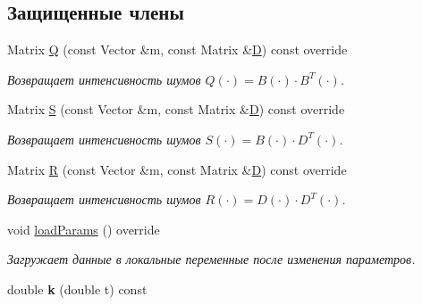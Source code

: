 \subsection*{Защищенные члены}
\begin{DoxyCompactItemize}
\item 
\hypertarget{class_tasks_1_1_continuous_1_1_landing_linear_a95641c126ba2e99da83cd6f3683b6238}{}\label{class_tasks_1_1_continuous_1_1_landing_linear_a95641c126ba2e99da83cd6f3683b6238} 
Matrix \hyperlink{class_tasks_1_1_continuous_1_1_landing_linear_a95641c126ba2e99da83cd6f3683b6238}{Q} (const Vector \&m, const Matrix \&\hyperlink{class_tasks_1_1_continuous_1_1_landing_linear_a829c4b67c6a4cd8bb1a430e4e55d9d45}{D}) const override
\begin{DoxyCompactList}\small\item\em Возвращает интенсивность шумов $Q(\cdot) = B(\cdot) \cdot B^T(\cdot)$. \end{DoxyCompactList}\item 
Matrix \hyperlink{class_tasks_1_1_continuous_1_1_landing_linear_a886bc6dd08e4355ab0c491d48f9de002}{S} (const Vector \&m, const Matrix \&\hyperlink{class_tasks_1_1_continuous_1_1_landing_linear_a829c4b67c6a4cd8bb1a430e4e55d9d45}{D}) const override
\begin{DoxyCompactList}\small\item\em Возвращает интенсивность шумов $S(\cdot) = B(\cdot) \cdot D^T(\cdot)$. \end{DoxyCompactList}\item 
\hypertarget{class_tasks_1_1_continuous_1_1_landing_linear_a1eaa8243f547b6cbd3b29ec625f887a8}{}\label{class_tasks_1_1_continuous_1_1_landing_linear_a1eaa8243f547b6cbd3b29ec625f887a8} 
Matrix \hyperlink{class_tasks_1_1_continuous_1_1_landing_linear_a1eaa8243f547b6cbd3b29ec625f887a8}{R} (const Vector \&m, const Matrix \&\hyperlink{class_tasks_1_1_continuous_1_1_landing_linear_a829c4b67c6a4cd8bb1a430e4e55d9d45}{D}) const override
\begin{DoxyCompactList}\small\item\em Возвращает интенсивность шумов $R(\cdot) = D(\cdot) \cdot D^T(\cdot)$. \end{DoxyCompactList}\item 
\hypertarget{class_tasks_1_1_continuous_1_1_landing_linear_ac860d39de1972d7484ac665d174b0b94}{}\label{class_tasks_1_1_continuous_1_1_landing_linear_ac860d39de1972d7484ac665d174b0b94} 
void \hyperlink{class_tasks_1_1_continuous_1_1_landing_linear_ac860d39de1972d7484ac665d174b0b94}{load\+Params} () override
\begin{DoxyCompactList}\small\item\em Загружает данные в локальные переменные после изменения параметров. \end{DoxyCompactList}\item 
\hypertarget{class_tasks_1_1_continuous_1_1_landing_linear_a86dec31973563586ae516afb49f16c6c}{}\label{class_tasks_1_1_continuous_1_1_landing_linear_a86dec31973563586ae516afb49f16c6c} 
double {\bfseries k} (double t) const
\end{DoxyCompactItemize}
